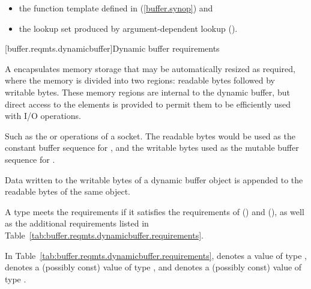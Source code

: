 \begin{itemize}
\item the  function template defined in  (\ref{buffer.synop}) and
\item the lookup set produced by argument-dependent lookup ().
\end{itemize}


[buffer.reqmts.dynamicbuffer]{Dynamic buffer requirements}

\pnum
A  encapsulates memory storage that may be automatically resized as required, where the memory is divided into two regions: readable bytes followed by writable bytes. These memory regions are internal to the dynamic buffer, but direct access to the elements is provided to permit them to be efficiently used with I/O operations. \begin{note} Such as the  or  operations of a socket. The readable bytes would be used as the constant buffer sequence for , and the writable bytes used as the mutable buffer sequence for . \end{note} Data written to the writable bytes of a dynamic buffer object is appended to the readable bytes of the same object.

\pnum
A type  meets the  requirements if it satisfies the requirements of  () and  (), as well as the additional requirements listed in Table~\ref{tab:buffer.reqmts.dynamicbuffer.requirements}.

\pnum
In Table~\ref{tab:buffer.reqmts.dynamicbuffer.requirements},
 denotes a value of type ,
 denotes a (possibly const) value of type ,
and  denotes a (possibly const) value of type .

